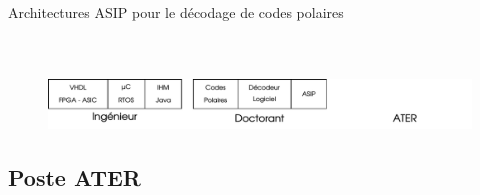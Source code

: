 \documentclass[t,compress,mathserif,12pt,xcolor=dvipsnames]{beamer}
\begin{document}
\begin{frame}[t]{Architectures ASIP pour le décodage de codes polaires}
\begin{minipage}[t][5.0cm][t]{\textwidth}
\begin{columns}[T]
\begin{column}{0.40\textwidth}
{\begin{table}
{{\begin{tabular}{c|c|c|c|c}
        \bottomrule
      \end{tabular}
      }}
    \end{table}
    }


      \end{column}
    \end{columns}
  \end{minipage}
  \begin{figure}[htp]
    \centering
    \includegraphics[width=\textwidth]{fig/frise7}
  \end{figure}
\end{frame}

\subsection{Poste ATER}
\end{document}
